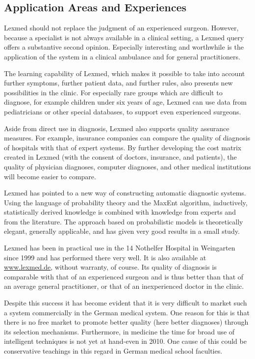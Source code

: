 \documentclass[10pt]{book}
\begin{document}
\subsection{Application Areas and Experiences}
Lexmed should not replace the judgment of an experienced surgeon. However, because a specialist is not always available in a clinical setting, a Lexmed query offers a substantive second opinion. Especially interesting and worthwhile is the application of the system in a clinical ambulance and for general practitioners.

The learning capability of Lexmed, which makes it possible to take into account further symptoms, further patient data, and further rules, also presents new possibilities in the clinic. For especially rare groups which are difficult to diagnose, for example children under six years of age, Lexmed can use data from pediatricians or other special databases, to support even experienced surgeons.

Aside from direct use in diagnosis, Lexmed also supports quality assurance measures. For example, insurance companies can compare the quality of diagnosis of hospitals with that of expert systems. By further developing the cost matrix created in Lexmed (with the consent of doctors, insurance, and patients), the quality of physician diagnoses, computer diagnoses, and other medical institutions will become easier to compare.

Lexmed has pointed to a new way of constructing automatic diagnostic systems. Using the language of probability theory and the MaxEnt algorithm, inductively,\\
statistically derived knowledge is combined with knowledge from experts and from the literature. The approach based on probabilistic models is theoretically elegant, generally applicable, and has given very good results in a small study.

Lexmed has been in practical use in the 14 Nothelfer Hospital in Weingarten since 1999 and has performed there very well. It is also available at \href{http://www.lexmed.de}{www.lexmed.de}, without warranty, of course. Its quality of diagnosis is comparable with that of an experienced surgeon and is thus better than that of an average general practitioner, or that of an inexperienced doctor in the clinic.

Despite this success it has become evident that it is very difficult to market such a system commercially in the German medical system. One reason for this is that there is no free market to promote better quality (here better diagnoses) through its selection mechanisms. Furthermore, in medicine the time for broad use of intelligent techniques is not yet at hand-even in 2010. One cause of this could be conservative teachings in this regard in German medical school faculties.
\end{document}
